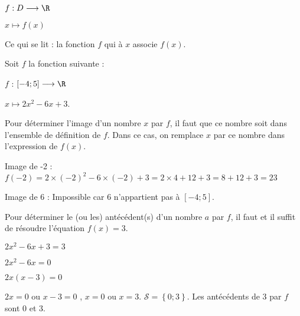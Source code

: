 \begin{Nt}
$f : D \longrightarrow \R$

$x \mapsto f(x)$

Ce qui se lit : la fonction $f$ qui à $x$ associe $f(x)$.
\end{Nt}

\begin{Mt}
Soit $f$ la fonction suivante :

$f$ : $[-4 ; 5] \longrightarrow \R$

$x \mapsto 2x^2 - 6x + 3$.

\begin{description}
\item Pour déterminer l'image d'un nombre $x$ par $f$, il faut que ce nombre soit dans l'ensemble de définition de $f$. Dans ce cas, on remplace $x$ par ce nombre dans l'expression de $f(x)$.

Image de -2 : $f(-2) = 2 \times (-2)^2 -6 \times (-2) + 3 = 2 \times 4 + 12 + 3 = 8 + 12 + 3 = 23$

Image de 6 : Impossible car 6 n'appartient pas à $[-4 ; 5]$.

\item  Pour déterminer le (ou les) antécédent(s) d'un nombre $a$ par $f$, il faut et il suffit de résoudre l'équation $f(x) = 3$.

$2x^2 - 6x + 3 = 3$

$2x^2 - 6x = 0$

$2x (x - 3) = 0$

$2x = 0$ ou $x - 3 = 0$ , $x = 0$ ou  $x = 3$. $\mathscr{S}=\left\lbrace 0;3\right\rbrace $. Les antécédents de 3 par $f$ sont 0 et 3.
\end{description}
\end{Mt}










